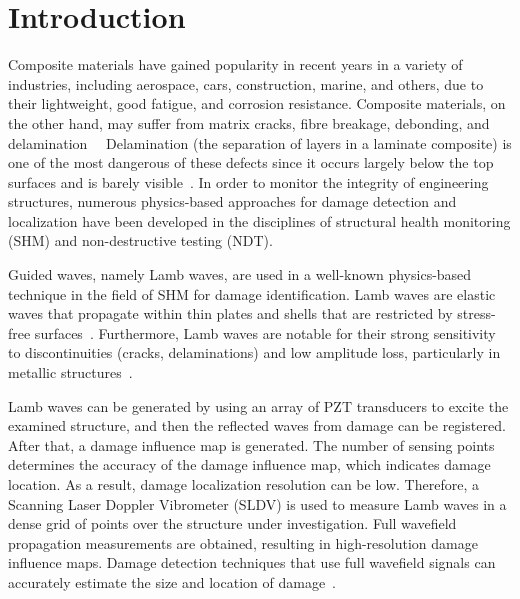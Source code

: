 \documentclass[runningheads]{llncs}
\begin{document}
\section{Introduction}
Composite materials have gained popularity in recent years in a variety of industries, including aerospace, cars, construction, marine, and others, due to their lightweight, good fatigue, and corrosion resistance.
Composite materials, on the other hand, may suffer from matrix cracks, fibre breakage, debonding, and delamination~\cite{ip2004delamination}~\cite{smith2009composite}
Delamination (the separation of layers in a laminate composite) is one of the most dangerous of these defects since it occurs largely below the top surfaces and is barely visible~\cite{Cai2012}.
%
In order to monitor the integrity of engineering structures, numerous physics-based approaches for damage detection and localization have been developed in the disciplines of structural health monitoring (SHM) and non-destructive testing (NDT).

Guided waves, namely Lamb waves, are used in a well-known physics-based technique in the field of SHM for damage identification.
Lamb waves are elastic waves that propagate within thin plates and shells that are restricted by stress-free surfaces~\cite{mitra2016guided}.
Furthermore, Lamb waves are notable for their strong sensitivity to discontinuities (cracks, delaminations) and low amplitude loss, particularly in metallic structures~\cite{Keulen2014}.

Lamb waves can be generated by using an array of PZT transducers to excite the examined structure, and then the reflected waves from damage can be registered.
After that, a damage influence map is generated.
The number of sensing points determines the accuracy of the damage influence map, which indicates damage location.
As a result, damage localization resolution can be low.
Therefore, a Scanning Laser Doppler Vibrometer (SLDV) is used to measure Lamb waves in a dense grid of points over the structure under investigation.
Full wavefield propagation measurements are obtained, resulting in high-resolution damage influence maps.
Damage detection techniques that use full wavefield signals can accurately estimate the size and location of damage~\cite{Girolamo2018a}.
\end{document}
